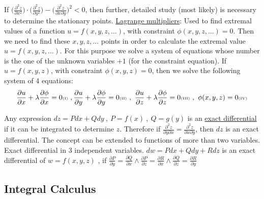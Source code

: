 \documentclass[12pt]{article}
\begin{document}
\begin{flushleft}
	\textbullet \quad If $\displaystyle \big( \frac{\partial^2 z}{\partial x^2} \big) \cdot \big( \frac{\partial^2 z}{\partial y^2} \big) - \big( \frac{\partial^2 z}{\partial x \partial y} \big)^2 < 0$, then further, detailed study (most likely) is necessary to determine the stationary points. \linebreak 
	\textbullet \quad \uline{Lagrange multipliers}: Used to find extremal values of a function $u= f(x,y,z,\ldots)$, with constraint $\phi (x,y,z,\ldots) = 0$. Then we need to find these $x,y,z,\ldots$ points in order to calculate the extremal value $u= f(x,y,z,\ldots)$. For this purpose we solve a system of equations whose number is the one of the unknown variables $+1$ (for the constraint equation). If $u=f(x,y,z)$, with constraint $\phi (x,y,z)=0$, then we solve the following system of 4 equations: \linebreak 
	$$ \frac{\partial u}{\partial x} + \lambda \frac{\partial \phi}{\partial x} = 0 {\text{\tiny (I)}} \ , \frac{\partial u}{\partial y} + \lambda \frac{\partial \phi}{\partial y} = 0 {\text{\tiny (II)}} \ , \ \frac{\partial u}{\partial z} + \lambda \frac{\partial \phi}{\partial z} = 0 {\text{\tiny (III)}} \ , \ \phi(x,y,z) = 0 {\text{\tiny (IV)}} $$ \linebreak 
	
	\textbullet \quad Any expression $\displaystyle dz = Pdx + Qdy \ , \ P = f(x) \ , \ Q = g(y)$ is an \uline{exact differential} if it can be integrated to determine $z$. Therefore if $\displaystyle \frac{\partial^2 z}{\partial y \partial x} = \frac{\partial^2 z}{\partial x\partial y}$, then $dz$ is an exact differential. The concept can be extended to functions of more than two variables. \linebreak 
	\textbullet \quad Exact differential in $3$ independent variables. \linebreak 
	$\displaystyle dw = P dx + Q dy + R dz$ is an exact differential of $\displaystyle w= f(x,y,z)$ , if $\displaystyle \frac{\partial P}{\partial y} = \frac{\partial Q}{\partial x} \land \frac{\partial P}{\partial z} = \frac{\partial R}{\partial x} \land \frac{\partial Q}{\partial z} = \frac{\partial R}{\partial y}$ \linebreak 	
	
	\subsection{Integral Calculus}
	

\end{flushleft}
\end{document}
